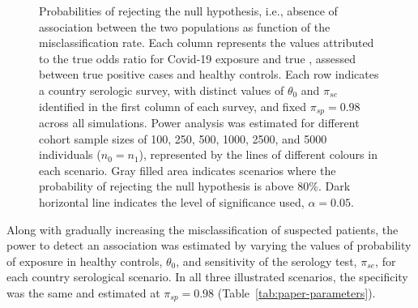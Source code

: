 \begin{figure}
    \centering{}
    \caption[Probabilities of rejecting the null hypothesis as function of the misclassification rate]{Probabilities of rejecting the null hypothesis, i.e., absence of association between the two populations as function of the misclassification rate. Each column represents the values attributed to the true odds ratio for Covid-19 exposure and true \cfs, assessed between true positive cases and healthy controls. Each row indicates a country serologic survey, with distinct values of $\theta_0$ and $\pi_{se}$ identified in the first column of each survey, and fixed $\pi_{sp} = 0.98$ across all simulations. Power analysis was estimated for different cohort sample sizes of 100, 250, 500, 1000, 2500, and 5000 individuals ($n_0 = n_1$), represented by the lines of different colours in each scenario. Gray filled area indicates scenarios where the probability of rejecting the null hypothesis is above 80\%. Dark horizontal line indicates the level of significance used, $\alpha=0.05$.}
    \label{fig:misrate-country}
\end{figure}

Along with gradually increasing the misclassification of suspected patients, the power to detect an association was estimated by varying the values of probability of exposure in healthy controls, $\theta_0$, and sensitivity of the serology test, $\pi_{se}$, for each country serological scenario. In all three illustrated scenarios, the specificity was the same and estimated at $\pi_{sp}=0.98$ (Table~\ref{tab:paper-parameters}).


